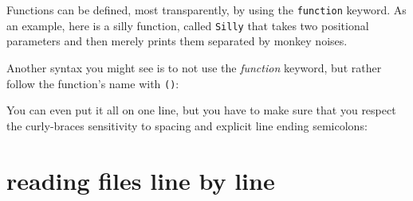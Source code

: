 \documentclass[]{krantz}
\makeatletter
\newenvironment{Shaded}{\begin{snugshade}}{\end{snugshade}}
\newcommand{\BuiltInTok}[1]{#1}
\newcommand{\CommentTok}[1]{\textcolor[rgb]{0.37,0.37,0.37}{\textit{#1}}}
\newcommand{\ExtensionTok}[1]{#1}
\newcommand{\FunctionTok}[1]{\textcolor[rgb]{0,0,0}{#1}}
\newcommand{\KeywordTok}[1]{\textcolor[rgb]{0.27,0.27,0.27}{\textbf{#1}}}
\newcommand{\NormalTok}[1]{#1}
\newcommand{\StringTok}[1]{\textcolor[rgb]{0.5,0.5,0.5}{#1}}
\newcommand{\VariableTok}[1]{\textcolor[rgb]{0,0,0}{#1}}
\newenvironment{kframe}{%
\medskip{}
\setlength{\fboxsep}{.8em}
 \def\at@end@of@kframe{}%
 \ifinner\ifhmode%
  \def\at@end@of@kframe{\end{minipage}}%
  \begin{minipage}{\columnwidth}%
 \fi\fi%
 \def\FrameCommand##1{\hskip\@totalleftmargin \hskip-\fboxsep
 \colorbox{shadecolor}{##1}\hskip-\fboxsep
     \hskip-\linewidth \hskip-\@totalleftmargin \hskip\columnwidth}%
 \MakeFramed {\advance\hsize-\width
   \@totalleftmargin\z@ \linewidth\hsize
   \@setminipage}}%
 {\par\unskip\endMakeFramed%
 \at@end@of@kframe}
\renewenvironment{Shaded}{\begin{kframe}}{\end{kframe}}
\makeatother
\begin{document}
Functions can be defined, most transparently, by using the \texttt{function} keyword.
As an example, here is a silly function, called \texttt{Silly} that takes two positional parameters
and then merely prints them separated by monkey noises.

\begin{Shaded}
\end{Shaded}

Another syntax you might see is to not use the \emph{function} keyword, but rather
follow the function's name with \texttt{()}:

\begin{Shaded}
\end{Shaded}

You can even put it all on one line, but you have to make sure that you respect
the curly-braces sensitivity to spacing and explicit line ending semicolons:

\begin{Shaded}
\end{Shaded}

\hypertarget{reading-files-line-by-line}{%
\section{reading files line by line}\label{reading-files-line-by-line}}
\end{document}
